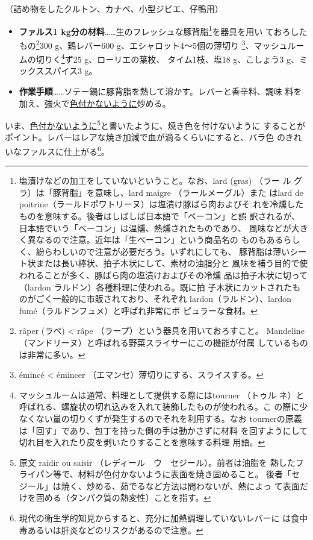 \begin{recette}


（詰め物をしたクルトン、カナペ、小型ジビエ、仔鴨用）

\begin{itemize}
\item
  \textbf{ファルス1
  kg分の材料}\ldots{}\ldots{}生のフレッシュな豚背脂\footnote{塩漬けなどの加工をしていないということ。なお、lard
    (gras) （ラー ル グラ）は「豚背脂」を意味し、lard maigre
    （ラールメーグル）また はlard de
    poitrine（ラールドポワトリーヌ）は塩漬け豚ばら肉およびそ
    れを冷燻したものを意味する。後者はしばしば日本語で「ベーコン」と誤
    訳されるが、日本語でいう「ベーコン」は温燻、熱燻されたものであり、
    風味などが大きく異なるので注意。近年は「生ベーコン」という商品名の
    ものもあるらしく、紛らわしいので注意が必要だろう。いずれにしても、
    豚背脂は薄いシート状または長い棒状、拍子木状にして、素材の油脂分と
    風味を補う目的で使われることが多く、豚ばら肉の塩漬けおよびその冷燻
    品は拍子木状に切って（lardon ラルドン）各種料理に使われる。既に拍
    子木状にカットされたものがごく一般的に市販されており、それぞれ
    lardon（ラルドン）、lardon fumé（ラルドンフュメ）と呼ばれ非常にポ
    ピュラーな食材。}を器具を用い ておろしたもの\footnote{râper (ラペ)
    \textless{} râpe （ラープ）という器具を用いておろすこと。 Mandeline
    （マンドリーヌ）と呼ばれる野菜スライサーにこの機能が付属
    しているものは非常に多い。}300 g、鶏レバー600
  g、エシャロット4〜5個の薄切り \footnote{émincé \textless{} émincer
    （エマンセ）薄切りにする、スライスする。}、マッシュルームの切りく\footnote{マッシュルームは通常、料理として提供する際にはtourner
    （トゥル
    ネ）と呼ばれる、螺旋状の切れ込みを入れて装飾したものが使われる。こ
    の際に少なくない量の切りくずが発生するのでそれを利用する。なお
    tournerの原義は「回す」であり、包丁を持った側の手は動かさずに材料
    を回すようにして切れ目を入れたり皮を剥いたりすることを意味する料理
    用語。}ず25
  g、ローリエの葉\undemi{}枚、 タイム1枝、塩18 g、こしょう3
  g、ミックススパイス3 g。
\item
  \textbf{作業手順}\ldots{}\ldots{}ソテー鍋に豚背脂を熱して溶かす。レバーと香辛料、調味
  料を加え、強火で\ul{色付かないように}炒める。
\end{itemize}

いま、\ul{色付かないように}\footnote{原文 raidir ou saisir
  （レディール　ウ　セジール）。前者は油脂を
  熱したフライパン等で、材料が色付かないように表面を焼き固めること。
  後者「セジール」は焼く、炒める、茹でるなど方法は問わないが、熱によっ
  て表面だけを固める（タンパク質の熱変性）ことを指す。}と書いたように、焼き色を付けないように
することがポイント。レバーはレアな焼き加減で血が滴るくらいにすると、バラ色
のきれいなファルスに仕上がる\footnote{現代の衛生学的知見からすると、充分に加熱調理していないレバーに
  は食中毒あるいは肝炎などのリスクがあるので注意。}。


\end{recette}
